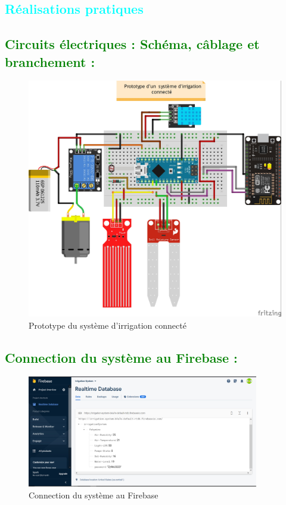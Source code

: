 \begin{flushleft}	
 	\section{\textcolor{cyan}{Réalisations pratiques}}
	\subsection{\textcolor{green}{Circuits électriques : Schéma, câblage et branchement :}}
	\begin{figure}[h]
		\centering
		\includegraphics{chapitres/images/Irrigation_bb.jpg}
		\caption{Prototype du système d'irrigation connecté}
		\label{fig:labelname}
	\end{figure}
	\newpage
	\subsection{\textcolor{green}{Connection du système au Firebase :}}
			\begin{figure}[h]
				\centering
				\includegraphics[width=0.9\textwidth]{chapitres/images/ConnectionEsp8266Firebase.PNG}
				\caption{Connection du système au Firebase}
				\label{fig:labelname}
			\end{figure}
	\newpage

\end{flushleft}
